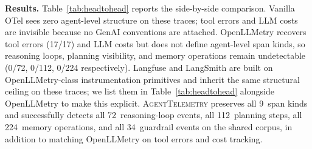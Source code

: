 \documentclass[sigconf,screen]{acmart}
\begin{document}
\textbf{Results.}
Table~\ref{tab:headtohead} reports the side-by-side comparison.
Vanilla OTel sees zero agent-level structure on these traces; tool
errors and LLM costs are invisible because no GenAI conventions are
attached.  OpenLLMetry recovers tool errors (17/17) and LLM costs but
does not define agent-level span kinds, so reasoning loops, planning
visibility, and memory operations remain undetectable
(0/72, 0/112, 0/224 respectively).  Langfuse and LangSmith are built
on OpenLLMetry-class instrumentation primitives and inherit the same
structural ceiling on these traces; we list them in
Table~\ref{tab:headtohead} alongside OpenLLMetry to make this explicit.
\textsc{AgentTelemetry} preserves all 9~span kinds and successfully
detects all 72~reasoning-loop events, all 112~planning steps, all
224~memory operations, and all 34~guardrail events on the shared
corpus, in addition to matching OpenLLMetry on tool errors and cost
tracking.
\end{document}
